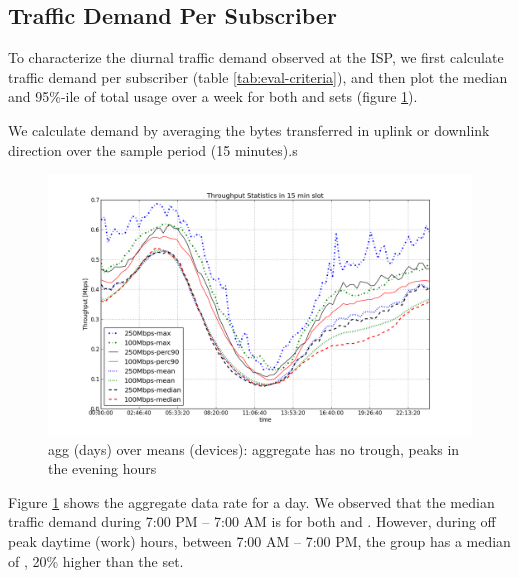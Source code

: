 \subsection{Traffic Demand Per Subscriber}\label{subsec:behavior}

To characterize the diurnal traffic demand observed at the ISP, we first 
calculate traffic demand per subscriber (table \ref{tab:eval-criteria}), and 
then plot the median and 95\%-ile of total usage over a week for both 
\treatment{} and \control{} sets (figure \ref{fig:TS-data-rate-daily}).

We calculate demand by averaging the 
bytes transferred in uplink or downlink direction over the sample period (15 
minutes).s


\begin{figure}[ht]
\begin{minipage}{\linewidth}
  \centering
  \includegraphics[width=\linewidth]{figures/describe-total-throughput-per-day[replace].png}
  \caption{agg (days) over means (devices): aggregate has no trough, peaks in the evening hours}
  \label{fig:TS-data-rate-daily}
\end{minipage}
\end{figure}

Figure \ref{fig:TS-data-rate-daily} shows the aggregate data rate for a day. 
We observed that the median traffic demand during 7:00 PM -- 7:00 AM is 
 for both \treatment{} and \control{}. However, during off peak 
daytime (work) hours, between 7:00 AM -- 7:00 PM, the \treatment{} group has a 
median of , 20\% higher than the \control{} set.

